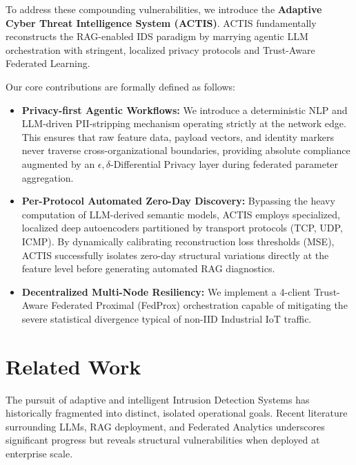 \documentclass[conference]{IEEEtran}
\begin{document}
To address these compounding vulnerabilities, we introduce the \textbf{Adaptive Cyber Threat Intelligence System (ACTIS)}. ACTIS fundamentally reconstructs the RAG-enabled IDS paradigm by marrying agentic LLM orchestration with stringent, localized privacy protocols and Trust-Aware Federated Learning.

Our core contributions are formally defined as follows:
\begin{itemize}
    \item \textbf{Privacy-first Agentic Workflows:} We introduce a deterministic NLP and LLM-driven PII-stripping mechanism operating strictly at the network edge. This ensures that raw feature data, payload vectors, and identity markers never traverse cross-organizational boundaries, providing absolute compliance augmented by an $\epsilon,\delta$-Differential Privacy layer during federated parameter aggregation.
    \item \textbf{Per-Protocol Automated Zero-Day Discovery:} Bypassing the heavy computation of LLM-derived semantic models, ACTIS employs specialized, localized deep autoencoders partitioned by transport protocols (TCP, UDP, ICMP). By dynamically calibrating reconstruction loss thresholds (MSE), ACTIS successfully isolates zero-day structural variations directly at the feature level before generating automated RAG diagnostics.
    \item \textbf{Decentralized Multi-Node Resiliency:} We implement a 4-client Trust-Aware Federated Proximal (FedProx) orchestration capable of mitigating the severe statistical divergence typical of non-IID Industrial IoT traffic.
\end{itemize}

\section{Related Work}
The pursuit of adaptive and intelligent Intrusion Detection Systems has historically fragmented into distinct, isolated operational goals. Recent literature surrounding LLMs, RAG deployment, and Federated Analytics underscores significant progress but reveals structural vulnerabilities when deployed at enterprise scale.
\end{document}
